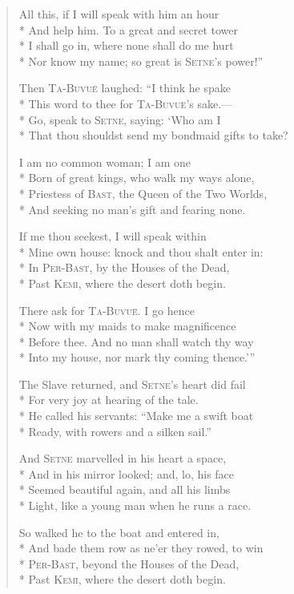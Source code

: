\documentclass[12pt]{article}
\newcommand{\vin}{\hspace{1em}}
\begin{document}
\begin{verse}
All this, if I will speak with him an hour\\*
And help him. To a great and secret tower\\*
\vin I shall go in, where none shall do me hurt\\*
Nor know my name; so great is \textsc{Setne}'s power!''

Then \textsc{Ta-Buvu\"{e}} laughed: ``I think he spake\\*
This word to thee for \textsc{Ta-Buvu\"{e}}'s sake.---\\*
\vin Go, speak to \textsc{Setne}, saying: `Who am I\\*
That thou shouldst send my bondmaid gifts to take?

I am no common woman; I am one\\*
Born of great kings, who walk my ways alone,\\*
\vin Priestess of \textsc{Bast}, the Queen of the Two Worlds,\\*
And seeking no man's gift and fearing none.

If me thou seekest, I will speak within\\*
Mine own house: knock and thou shalt enter in:\\*
\vin In \textsc{Per-Bast}, by the Houses of the Dead,\\*
Past \textsc{Kemi}, where the desert doth begin.

There ask for \textsc{Ta-Buvu\"{e}}. I go hence\\*
Now with my maids to make magnificence\\*
\vin Before thee. And no man shall watch thy way\\*
Into my house, nor mark thy coming thence.'{''}

The Slave returned, and \textsc{Setne}'s heart did fail\\*
For very joy at hearing of the tale.\\*
\vin He called his servants: ``Make me a swift boat\\*
Ready, with rowers and a silken sail.''

And \textsc{Setne} marvelled in his heart a space,\\*
And in his mirror looked; and, lo, his face\\*
\vin Seemed beautiful again, and all his limbs\\*
Light, like a young man when he runs a race.

So walked he to the boat and entered in,\\*
And bade them row as ne'er they rowed, to win\\*
\vin \textsc{Per-Bast}, beyond the Houses of the Dead,\\*
Past \textsc{Kemi}, where the desert doth begin.


\end{verse}
\end{document}
